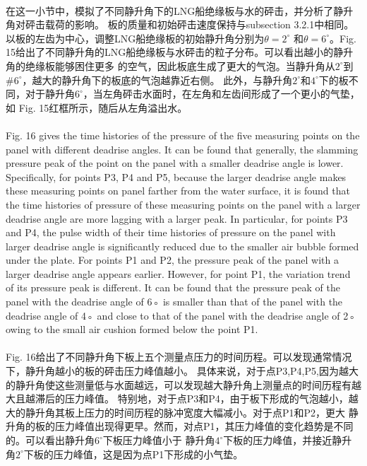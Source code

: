 \documentclass[UTF8]{ctexart}
\begin{document}
\paragraph{\quad}在这一小节中，模拟了不同静升角下的LNG船绝缘板与水的砰击，并分析了静升角对砰击载荷的影响。
                板的质量和初始砰击速度保持与subsection 3.2.1中相同。以板的左齿为中心，调整LNG船绝缘板的初始静升角分别为$\theta = 2^\circ$
                和$\theta = 6^\circ$。Fig. 15给出了不同静升角的LNG船绝缘板与水砰击的粒子分布。可以看出越小的静升角的绝缘板能够困住更多
                的空气，因此板底生成了更大的气泡。当静升角从$2^\circ$到#$6^\circ$，越大的静升角下的板底的气泡越靠近右侧。
                此外，与静升角$2^\circ$和$4^\circ$下的板不同，对于静升角$6^\circ$，当左角砰击水面时，在左角和左齿间形成了一个更小的气垫，如
                Fig. 15红框所示，随后从左角溢出水。

\paragraph{\quad}Fig. 16 gives the time histories of the pressure of the five measuring points on the panel 
                with different deadrise angles. It can be found that generally, the slamming pressure peak 
                of the point on the panel with a smaller deadrise angle is lower. Specifically, for points 
                P3, P4 and P5, because the larger deadrise angle makes these measuring points on panel farther 
                from the water surface, it is found that the time histories of pressure of these measuring 
                points on the panel with a larger deadrise angle are more lagging with a larger peak. 
                In particular, for points P3 and P4, the pulse width of their time histories of pressure on 
                the panel with larger deadrise angle is significantly reduced due to the smaller air bubble 
                formed under the plate. For points P1 and P2, the pressure peak of the panel with a larger 
                deadrise angle appears earlier. However, for point P1, the variation trend of its pressure 
                peak is different. It can be found that the pressure peak of the panel with the deadrise angle 
                of 6◦ is smaller than that of the panel with the deadrise angle of 4◦ and close to that of the 
                panel with the deadrise angle of 2◦ owing to the small air cushion formed below the point P1.
\paragraph{\quad}Fig. 16给出了不同静升角下板上五个测量点压力的时间历程。可以发现通常情况下，静升角越小的板的砰击压力峰值越小。
                具体来说，对于点P3,P4,P5,因为越大的静升角使这些测量低与水面越远，可以发现越大静升角上测量点的时间历程有越大且越滞后的压力峰值。
                特别地，对于点P3和P4，由于板下形成的气泡越小，越大的静升角其板上压力的时间历程的脉冲宽度大幅减小。对于点P1和P2，更大
                静升角的板的压力峰值出现得更早。然而，对点P1，其压力峰值的变化趋势是不同的。可以看出静升角$6^\circ$下板压力峰值小于
                静升角$4^\circ$下板的压力峰值，并接近静升角$2^\circ$下板的压力峰值，这是因为点P1下形成的小气垫。
\end{document}
